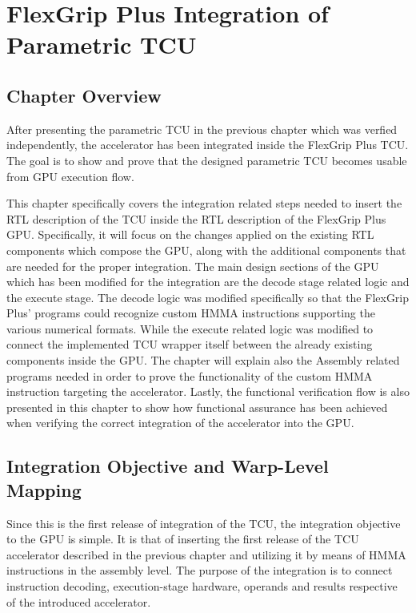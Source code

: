 \chapter{FlexGrip Plus Integration of Parametric TCU}

\section{Chapter Overview}
After presenting the parametric TCU in the previous chapter which was verfied independently, the accelerator has been integrated inside the FlexGrip Plus TCU. The goal is to show and prove that the designed parametric TCU becomes usable from GPU execution flow.

This chapter specifically covers the integration related steps needed to insert the RTL description of the TCU inside the RTL description of the FlexGrip Plus GPU. Specifically, it will focus on the changes applied on the existing RTL components which compose the GPU, along with the additional components that are needed for the proper integration. The main design sections of the GPU which has been modified for the integration are the decode stage related logic and the execute stage. The decode logic was modified specifically so that the FlexGrip Plus' programs could recognize custom HMMA instructions supporting the various numerical formats. While the execute related logic was modified to connect the implemented TCU wrapper itself between the already existing components inside the GPU. The chapter will explain also the Assembly related programs needed in order to prove the functionality of the custom HMMA instruction targeting the accelerator. Lastly, the functional verification flow is also presented in this chapter to show how functional assurance has been achieved when verifying the correct integration of the accelerator into the GPU.

\section{Integration Objective and Warp-Level Mapping}

Since this is the first release of integration of the TCU, the integration objective to the GPU is simple. It is that of inserting the first release of the TCU accelerator described in the previous chapter and utilizing it by means of HMMA instructions in the assembly level. The purpose of the integration is to connect instruction decoding, execution-stage hardware, operands and results respective of the introduced accelerator.

